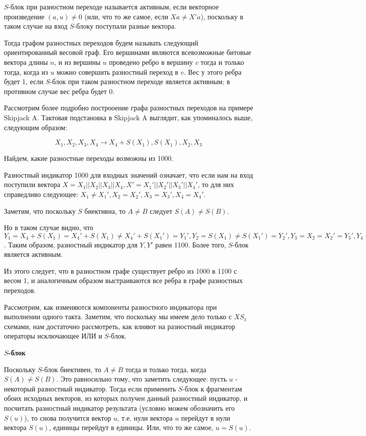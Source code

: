 \documentclass[a4paper,12pt]{extarticle}
\theoremstyle{plain} %
\begin{document}
\begin{large}
$S$-блок при разностном переходе называется активным, если векторное произведение $(a, u) \neq 0$ (или, что то же самое, если $Xa \neq X'a$), поскольку в таком случае на вход $S$-блоку поступали разные вектора.

Тогда графом разностных переходов будем называть следующий ориентированный весовой граф. Его вершинами являются всевозможные битовые вектора длины $n$, и из вершины $u$ проведено ребро в вершину $v$ тогда и только тогда, когда из $u$ можно совершить разностный переход в $v$. Вес у этого ребра будет 1, если $S$-блок при таком разностном переходе является активным; в противном случае вес ребра будет 0.

Рассмотрим более подробно построоение графа разностных переходов на примере Skipjack A. Тактовая подстановка в Skipjack A выглядит, как упоминалось выше, следующим образом:

$$X_1, X_2, X_3, X_4 \rightarrow X_4 + S(X_1), S(X_1), X_2, X_3$$

Найдем, какие разностные переходы возможны из 1000.

Разностный индикатор 1000 для входных значений означает, что если нам на вход поступили вектора $X=X_1||X_2||X_3||X_4, X'=X_1'||X_2'||X_3'||X_4'$, то для них справедливо следующее: $X_1\neq X_1', X_2=X_2', X_3 = X_3', X_4 = X_4'$. 

Заметим, что поскольку $S$ биективна, то $A \neq B$ следует $S(A) \neq S(B)$.

Но в таком случае видно, что $Y_1=X_4 + S(X_1)=X_4' + S(X_1)\neq X_4' + S(X_1')=Y_1', Y_2=S(X_1)\neq S(X_1')=Y_2', Y_3=X_2=X_2'=Y_3', Y_4=X_3= X_3'=Y_4'$. Таким образом, разностный индикатор для $Y, Y'$ равен 1100. Более того, $S$-блок является активным.

Из этого следует, что в разностном графе существует ребро из 1000 в 1100 с весом 1, и аналогичным образом выстраиваются все ребра в графе разностных переходов.

Рассмотрим, как изменяются компоненты разностного индикатора при выполнении одного такта. Заметим, что поскольку мы имеем дело только с $XS_1$ схемами, нам достаточно рассмотреть, как влияют на разностный индикатор операторы исключающее ИЛИ и $S$-блок.


\textbf{$S$-блок}

Поскольку $S$-блок биективен, то $A \neq B$ тогда и только тогда, когда $S(A) \neq S(B)$. Это равносильно тому, что заметить следующее: пусть $u$ - некоторый разностный индикатор. Тогда если применить $S$-блок к фрагментам обоих исходных векторов, из которых получен данный разностный индикатор, и посчитать разностный индикатор результата (условно можем обозначить его $S(u)$), то снова получится вектор $u$, т.е. нули вектора $u$ перейдут в нули вектора $S(u)$, единицы перейдут в единицы. Или, что то же самое, $u=S(u)$.


\end{large}
\end{document}
